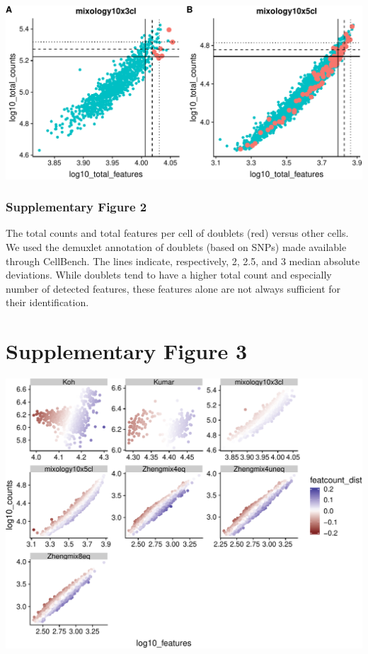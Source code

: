 \documentclass[]{article}
\begin{document}
\includegraphics{supp_figures_files/figure-latex/mixology_doublet_featcount-1.pdf}

\vfill

\hypertarget{supplementary-figure-2-1}{%
\subsubsection{Supplementary Figure 2}\label{supplementary-figure-2-1}}

The total counts and total features per cell of doublets (red) versus
other cells. We used the demuxlet annotation of doublets (based on SNPs)
made available through CellBench. The lines indicate, respectively, 2,
2.5, and 3 median absolute deviations. While doublets tend to have a
higher total count and especially number of detected features, these
features alone are not always sufficient for their identification.

\newpage

\hypertarget{supplementary-figure-3}{%
\section{Supplementary Figure 3}\label{supplementary-figure-3}}

\includegraphics{supp_figures_files/figure-latex/featcount_ratio-1.pdf}
\end{document}
